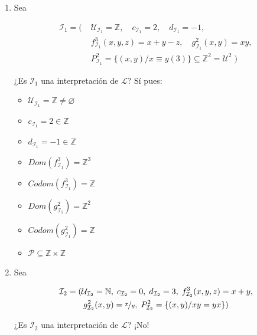 \begin{enumerate}
    \item Sea 

    \begin{align*}
        \mathcal{I}_1 = (\;
        &\mathcal{U}_{\mathcal{I}_1} = \mathbb{Z}, \quad
        c_{\mathcal{I}_1} = 2, \quad
        d_{\mathcal{I}_1} = -1, \\
        &f_{\mathcal{I}_1}^3 (x,y,z) = x+y-z, \quad
        g_{\mathcal{I}_1}^2 (x,y) = xy, \\
        & P_{\mathcal{I}_1}^2 = \{ (x,y)/ x \equiv y (3) \}
        \subseteq \mathbb{Z}^{2} = \mathcal{U}^{2}
        \;)
    \end{align*}

    \medskip

    ¿Es $\mathcal{I}_1$ una interpretación de $\mathcal{L}$? Sí pues:

    \begin{itemize}[label=\cmark]
        \item $\mathcal{U}_{\mathcal{I}_1} = \mathbb{Z} \neq \varnothing$
        \item  $c_{\mathcal{I}_1} = 2 \in \mathbb{Z}$
        \item  $d_{\mathcal{I}_1} = -1 \in \mathbb{Z}$
        \item  $Dom(f_{\mathcal{I}_1}^3) = \mathbb{Z}^3$
        \item  $Codom(f_{\mathcal{I}_1}^3) = \mathbb{Z}$
        \item  $Dom(g_{\mathcal{I}_1}^2) = \mathbb{Z}^2$
        \item  $Codom(g_{\mathcal{I}_1}^2) = \mathbb{Z}$
        \item  $\mathcal{P} \subseteq \mathbb{Z} \times \mathbb{Z}$
    \end{itemize}

    \item Sea 

        \begin{gather*}
        \mathcal{I}_2 = (\mathcal{U}_{\mathcal{I}_2} = \mathbb{N}, \;
        c_{\mathcal{I}_2} = 0, \;
        d_{\mathcal{I}_2} = 3, \;
        f_{\mathcal{I}_2}^3 (x,y,z) = x+y, \\
        g_{\mathcal{I}_2}^2 (x,y) = \nicefrac{x}{y}, \;
        P_{\mathcal{I}_2}^2 = \{ (x,y)/ xy=yx \}
        ) 
    \end{gather*}

    \medskip

    ¿Es $\mathcal{I}_2$ una interpretación de $\mathcal{L}$? ¡No!


\end{enumerate}
